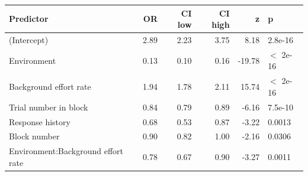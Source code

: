 \begin{table}[ht]
\centering
\begin{tabular}{lrrrrl}
  \hline
Predictor & OR & CI low & CI high & z & p \\ 
  \hline
(Intercept) & 2.89 & 2.23 & 3.75 & 8.18 & 2.8e-16 \\ 
  Environment & 0.13 & 0.10 & 0.16 & -19.78 & $<$ 2e-16 \\ 
  Background effort rate & 1.94 & 1.78 & 2.11 & 15.74 & $<$ 2e-16 \\ 
  Trial number in block & 0.84 & 0.79 & 0.89 & -6.16 & 7.5e-10 \\ 
  Response history & 0.68 & 0.53 & 0.87 & -3.22 & 0.0013 \\ 
  Block number & 0.90 & 0.82 & 1.00 & -2.16 & 0.0306 \\ 
  Environment:Background effort rate & 0.78 & 0.67 & 0.90 & -3.27 & 0.0011 \\ 
   \hline
\end{tabular}
\end{table}
